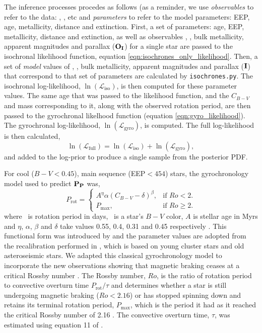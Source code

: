 The inference processes procedes as follows (as a reminder, we use {\it
observables} to refer to the data: \teff, \logg, etc and {\it parameters} to
refer to the model parameters: EEP, age, metallicity, distance and extinction.
First, a set of parameters: age, EEP, metallicity, distance and extinction, as
well as observables \teff, \logg, bulk metallicity, apparent magnitudes and
parallax (${\bf O_I}$) for a single star are passed to the isochronal
likelihood function, equation \eqref{eqn:isochrones_only_likelihood}.
Then, a set of {\it model} values of \teff, \logg, bulk metallicity, apparent
magnitudes and parallax (${\bf I}$) that correspond to that set of parameters
are calculated by {\tt isochrones.py}.
The isochronal log-likelihood, $\ln(\mathcal{L}_{\mathrm{iso}})$, is then
computed for these parameter values.
The same age that was passed to the likelihood function, and the $C_{B-V}$ and
mass corresponding to it, along with the observed rotation period, are then
passed to the gyrochronal likelhood function (equation
\ref{eqn:gyro_likelihood}).
The gyrochronal log-likelihood, $\ln(\mathcal{L}_{\mathrm{gyro}})$, is
computed.
The full log-likelihood is then calculated,
\begin{equation} \label{eqn:both_likelihood}
\ln(\mathcal{L}_{\mathrm{full}})
= \ln(\mathcal{L}_{\mathrm{iso}}) + \ln(\mathcal{L}_{\mathrm{gyro}}),
\end{equation}
and added to the log-prior to produce a single sample from the posterior PDF.

For cool ($B-V < 0.45$), main sequence (EEP$<454$) stars, the gyrochronology
model used to predict $\bf{P_P}$ was,
\begin{equation}
    P_\mathrm{rot} =\begin{cases}
        A^\eta \alpha (C_{B-V} - \delta)^\beta, & \text{if $Ro < 2$}. \\
        P_{\mathrm{max}}, & \text{if $Ro \geq 2$}.
    \end{cases}
\label{eqn:gyro}
\end{equation}
where \prot\ is rotation period in days, \cbv\ is a star's $B-V$ color, $A$ is
stellar age in Myrs and $\eta$, $\alpha$, $\beta$ and $\delta$ take values
0.55, 0.4, 0.31 and 0.45 respectively \citep{angus2015}.
This functional form was introduced by \citep{barnes2007} and the parameter
values are adopted from the recalibration performed in \citet{angus2015},
which is based on young cluster stars and old asteroseismic stars.
We adapted this classical gyrochronology model to incorporate the new
observations showing that magnetic braking ceases at a critical Rossby number
\citep{vansaders2016}.
The Rossby number, $Ro$, is the ratio of rotation period to convective
overturn time $P_{\mathrm{rot}}/\tau$ and determines whether a star is still
undergoing magnetic braking ($Ro < 2.16$) or has stopped spinning down and
retains its terminal rotation period, $P_\mathrm{max}$, which is the period it
had as it reached the critical Rossby number of 2.16 \citep{vansaders2016}.
The convective overturn time, $\tau$, was estimated using equation 11 of
\citet{wright2011}.

